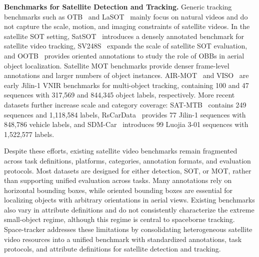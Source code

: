 \documentclass{article}
\begin{document}
\noindent\textbf{Benchmarks for Satellite Detection and Tracking.} Generic tracking benchmarks such as OTB~\citep{wu2013otb} and LaSOT~\citep{fan2019lasot} mainly focus on natural videos and do not capture the scale, motion, and imaging constraints of satellite videos. In the satellite SOT setting, SatSOT~\citep{satSOT2022} introduces a densely annotated benchmark for satellite video tracking, SV248S~\citep{Li2022SV248S} expands the scale of satellite SOT evaluation, and OOTB~\citep{CHEN2024212ootb} provides oriented annotations to study the role of OBBs in aerial object localization. Satellite MOT benchmarks provide denser frame-level annotations and larger numbers of object instances. AIR-MOT~\citep{He2022TGraM} and VISO~\citep{yin2021viso} are early Jilin-1 VNIR benchmarks for multi-object tracking, containing 100 and 47 sequences with 317{,}569 and 844{,}345 object labels, respectively. More recent datasets further increase scale and category coverage: SAT-MTB~\citep{Li2023SATMTB} contains 249 sequences and 1{,}118{,}584 labels, RsCarData~\citep{Xiao2024HiEUM} provides 77 Jilin-1 sequences with 848{,}786 vehicle labels, and SDM-Car~\citep{Zhang2024SDMCar} introduces 99 Luojia 3-01 sequences with 1{,}522{,}577 labels.

Despite these efforts, existing satellite video benchmarks remain fragmented across task definitions, platforms, categories, annotation formats, and evaluation protocols. Most datasets are designed for either detection, SOT, or MOT, rather than supporting unified evaluation across tasks. Many annotations rely on horizontal bounding boxes, while oriented bounding boxes are essential for localizing objects with arbitrary orientations in aerial views. Existing benchmarks also vary in attribute definitions and do not consistently characterize the extreme small-object regime, although this regime is central to spaceborne tracking. Space-tracker addresses these limitations by consolidating heterogeneous satellite video resources into a unified benchmark with standardized annotations, task protocols, and attribute definitions for satellite detection and tracking.
\end{document}
